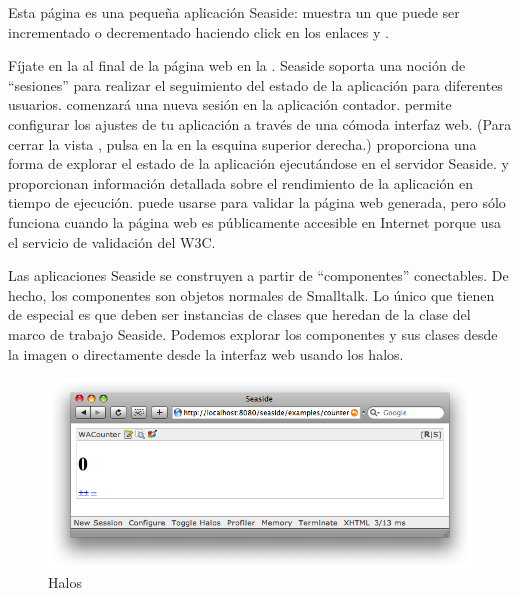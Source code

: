 \documentclass[a4paper,10pt,twoside]{book}
\begin{document}
\noindent
Esta página es una pequeña aplicación Seaside: muestra un  que puede ser incrementado o decrementado haciendo click en los enlaces \link{++} y \link{--\,--}.

\noindent
{} 

Fíjate en la  al final de la página web en la .
Seaside soporta una noción de ``sesiones'' para realizar el seguimiento del estado de la aplicación para diferentes usuarios.
 comenzará una nueva sesión en la aplicación contador.
 permite configurar los ajustes de tu aplicación a través de una cómoda interfaz web.
(Para cerrar la vista , pulsa en la  en la esquina superior derecha.)
 proporciona una forma de explorar el estado de la aplicación ejecutándose en el servidor Seaside.
 y  proporcionan información detallada sobre el rendimiento de la aplicación en tiempo de ejecución.
 puede usarse para validar la página web generada, pero sólo funciona cuando la página web es públicamente accesible en Internet porque usa el servicio de validación del W3C.

Las aplicaciones Seaside se construyen a partir de ``componentes'' conectables.
De hecho, los componentes son objetos normales de Smalltalk.
Lo único que tienen de especial es que deben ser instancias de clases que heredan de la clase  del marco de trabajo Seaside.
Podemos explorar los componentes y sus clases desde la imagen \pharo o directamente desde la interfaz web usando los halos.

\begin{figure}[ht]
\begin{center}
\includegraphics[width=\textwidth]{counterHalos}
\caption{Halos}
\end{center}
\end{figure}
\end{document}
